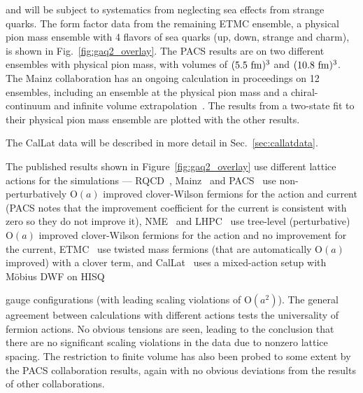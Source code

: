 \documentclass{ar-1col}
\begin{document}
 and will be subject to systematics from neglecting sea effects from strange quarks.
The form factor data from the remaining ETMC ensemble,
 a physical pion mass ensemble with 4 flavors of sea quarks (up, down, strange and charm),
 is shown in Fig.~\ref{fig:gaq2_overlay}.
The PACS results are on two different ensembles with physical pion mass,
 with volumes of $(5.5~{\rm fm})^3$ and $(10.8~{\rm fm})^3$.
The Mainz collaboration has an ongoing calculation in proceedings on 12 ensembles,
 including an ensemble at the physical pion mass
 and a chiral-continuum and infinite volume extrapolation~\cite{Djukanovic:2021yqg}.
The results from a two-state fit to their physical pion mass ensemble
 are plotted with the other results.%
\begin{marginnote}
\end{marginnote}%
The CalLat data will be described in more detail in Sec.~\ref{sec:callatdata}.


The published results shown in Figure~\ref{fig:gaq2_overlay} use different lattice actions for the simulations ---
RQCD~\cite{RQCD:2019jai}, Mainz~\cite{Djukanovic:2021yqg} and PACS~\cite{Ishikawa:2018rew,Shintani:2018ozy,Ishikawa:2021eut} use non-perturbatively $\mathrm{O}(a)$ improved clover-Wilson fermions for the action and current (PACS notes that the improvement coefficient for the current is consistent with zero so they do not improve it),
NME~\cite{Park:2021ypf} and LHPC~\cite{Hasan:2017wwt} use tree-level (perturbative) $\mathrm{O}(a)$ improved clover-Wilson fermions for the action and no improvement for the current,
 ETMC~\cite{Alexandrou:2020okk} use twisted mass fermions (that are automatically $\mathrm{O}(a)$ improved) with a clover term,
 and CalLat~\cite{Meyer:2021vfq} uses a mixed-action setup with M\"obius DWF
 on HISQ~\cite{MILC:2012znn}%
 \begin{marginnote}
 \end{marginnote}%
 gauge configurations (with leading scaling violations of $\mathrm{O}(a^2)$).
The general agreement between calculations with different actions tests
 the universality of fermion actions.
No obvious tensions are seen,
 leading to the conclusion that there are no significant scaling violations
 in the data due to nonzero lattice spacing.
The restriction to finite volume has also been probed to some extent by
 the PACS collaboration results,
 again with no obvious deviations from the results of other collaborations.
\end{document}
